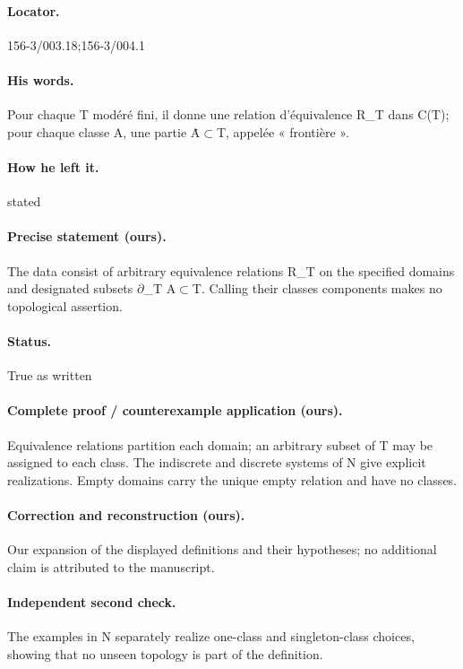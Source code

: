 \paragraph{Locator.} 156-3/003.18;156-3/004.1

\paragraph{His words.} Pour chaque T modéré fini, il donne une relation d’équivalence R\_T dans C(T); pour chaque classe A, une partie Ȧ\ensuremath{\subset}T, appelée « frontière ».

\paragraph{How he left it.} stated

\paragraph{Precise statement (ours).} The data consist of arbitrary equivalence relations R\_T on the specified domains and designated subsets \ensuremath{\partial}\_T A\ensuremath{\subset}T. Calling their classes components makes no topological assertion.

\paragraph{Status.} True as written

\paragraph{Complete proof / counterexample application (ours).} Equivalence relations partition each domain; an arbitrary subset of T may be assigned to each class. The indiscrete and discrete systems of N give explicit realizations. Empty domains carry the unique empty relation and have no classes.

\paragraph{Correction and reconstruction (ours).} Our expansion of the displayed definitions and their hypotheses; no additional claim is attributed to the manuscript.

\paragraph{Independent second check.} The examples in N separately realize one-class and singleton-class choices, showing that no unseen topology is part of the definition.

